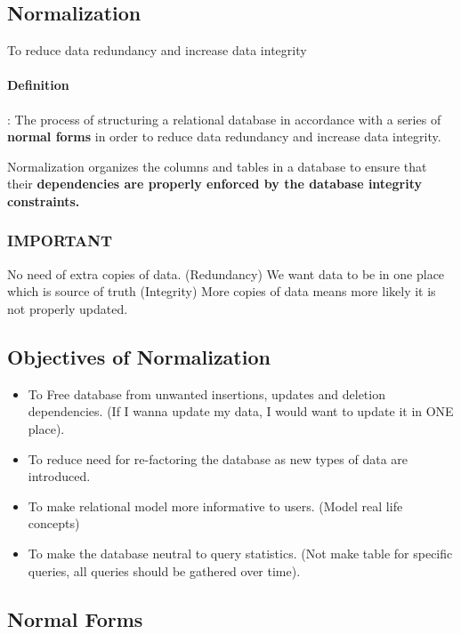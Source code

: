 \documentclass[
	paper=a4,%
	pagesize,%
	8pt, fleqn,%
	headings=small,%
	notitlepage,%
	parskip=never]%
	{scrreprt}
\begin{document}
\begin{multicols*}{3}
\section{Normalization}
To reduce data redundancy and increase data integrity

\paragraph{Definition}: The process of structuring a relational database in accordance with a series of \textbf{normal forms} in order to reduce data redundancy and increase data integrity. 

Normalization organizes the columns and tables in a database to ensure that their \textbf{dependencies are properly enforced by the database integrity constraints.}

\subsubsection*{IMPORTANT}
No need of extra copies of data. (Redundancy)
We want data to be in one place which is source of truth (Integrity)
More copies of data means more likely it is not properly updated.

\subsection{Objectives of Normalization}
\begin{itemize}
\item To Free database from unwanted insertions, updates and deletion dependencies. (If I wanna update my data, I would want to update it in ONE place).

\item To reduce need for re-factoring the database as new types of data are introduced.

\item To make relational model more informative to users. (Model real life concepts)

\item To make the database neutral to query statistics. (Not make table for specific queries, all queries should be gathered over time).

\end{itemize}

\subsection{Normal Forms}


\end{multicols*}
\end{document}
